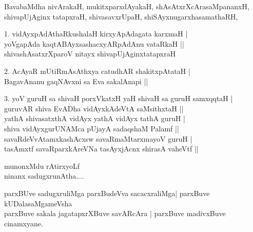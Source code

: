 \begin{entry}
\gl{}
\info{}{}{}{}
\begin{shl}
BavabaMdha nivArakaH, mukitxparxdAyakaH, shAsAtxrXcArasaMpananxH,\\
shivapUjAginx tatapxraH, shivasavxrUpaH, shiSAyxnugarxhasamathaRH,
\end{shl}
\begin{shl}
1. vidAyxpAdAthaRkushalaH kirxyApAdagata karxmaH |\\
yoVgapAda kaqtABAyxsashacxyARpAdAnu vataRkaH ||\\
shivashAsatxrXparoV nitayx shivapUjAginxtatapxraH
\end{shl}
\begin{shl}
2. AcAyaR mUtiRmAsAthxya catudhAR shakitxpAtataH |\\
BagavAnanu gaqNAvxni sa Eva sakalAnapi ||
\end{shl}
\begin{shl}
3. yoV guruH sa shivaH porxVkatxH yaH shivaH sa guruH samxqqtaH |\\
guruvAR shiva EvADha vidAyxkAdeVtA saMsithxtaH ||\\
yathA shivasatxthA vidAyx yathA vidAyx tathA guruH |\\
shiva vidAyxgurUNAMca pUjayA sadaqshaM Palamf ||\\
savaRdeVvAtamxkashAcxsw savaRmaMtarxmayoV guruH |\\
tasAmxtf savaRparxkAreVNa tasAyxjAcnx shirasA vaheVtf ||
\end{shl}
\end{entry}

\begin{entry}
\gl{}
\begin{shl}
munonxMdu rAtirxyoLf\\
ninanx sadugxrunAtha....
\end{shl}
\end{entry}

\begin{entry}
\begin{shl}
parxBUve sadugxruliMga parxBudeVva sacacxraliMga| parxBuve
kUDalasaMgameVsha\\
parxBuve sakala jagatapxrXBuve savARcAra | parxBuve madivxBuve cinamxyane.
\end{shl}
\end{entry}

